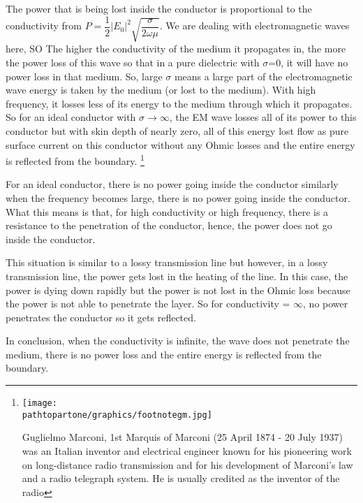 The power that is being lost inside the conductor is proportional to the conductivity from $P=\dfrac{1}{2}\lvert E_{0}\rvert^{2}\sqrt{\dfrac{\sigma}{2\omega\mu}}$.
We are dealing with electromagnetic waves here, SO The higher the conductivity of the medium it propagates in, the more the power loss of this wave so that in a pure dielectric with $\sigma$=0, it will have no power loss in that medium. So, large $\sigma$ means a large part of the electromagnetic wave energy is taken by the medium (or lost to the medium). With high frequency, it losses less of its energy to the medium through which it propagates. So for an ideal conductor with $\sigma\longrightarrow\infty$, the EM wave losses all of its power to this conductor but with skin depth of nearly zero, all of this energy lost flow as pure surface current on this conductor without any Ohmic losses and the entire energy is reflected from the boundary.
\footnote{
\texttt{[image: \\pathtopartone/graphics/footnotegm.jpg]}

Guglielmo Marconi, 1st Marquis of Marconi (25 April 1874 - 20 July 1937) was an Italian inventor and electrical engineer known for his pioneering work on long-distance radio transmission and for his development of Marconi's law and a radio telegraph system. He is usually credited as the inventor of the radio
}

For an ideal conductor, there is no power going inside the conductor similarly when the frequency becomes large, there is no power going inside the conductor. What this means is that, for high conductivity or high frequency, there is a resistance to the penetration of the conductor, hence, the power does not go inside the conductor.

This situation is similar to a lossy transmission line but however, in a lossy transmission line, the power gets lost in the heating of the line. In this case, the power is dying down rapidly but the power is not lost in the Ohmic loss because the power is not able to penetrate the layer. So for conductivity = $\infty$, no power penetrates the conductor so it gets reflected.

In conclusion, when the conductivity is infinite, the wave does not penetrate the medium, there is no power loss and the entire energy is reflected from the boundary.
